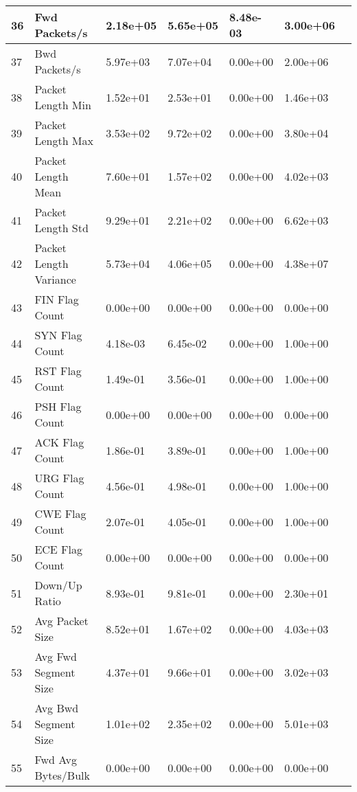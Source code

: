 \begin{center}
\begin{longtable}{|l|l|l|l|l|l|l|}
        \hline
        36 & Fwd Packets/s & 2.18e+05 & 5.65e+05 & 8.48e-03 & 3.00e+06 \\
        \hline
        37 & Bwd Packets/s & 5.97e+03 & 7.07e+04 & 0.00e+00 & 2.00e+06 \\
        \hline
        38 & Packet Length Min & 1.52e+01 & 2.53e+01 & 0.00e+00 & 1.46e+03 \\
        \hline
        39 & Packet Length Max & 3.53e+02 & 9.72e+02 & 0.00e+00 & 3.80e+04 \\
        \hline
        40 & Packet Length Mean & 7.60e+01 & 1.57e+02 & 0.00e+00 & 4.02e+03 \\
        \hline
        41 & Packet Length Std & 9.29e+01 & 2.21e+02 & 0.00e+00 & 6.62e+03 \\
        \hline
        42 & Packet Length Variance & 5.73e+04 & 4.06e+05 & 0.00e+00 & 4.38e+07 \\
        \hline
        43 & FIN Flag Count & 0.00e+00 & 0.00e+00 & 0.00e+00 & 0.00e+00 \\
        \hline
        44 & SYN Flag Count & 4.18e-03 & 6.45e-02 & 0.00e+00 & 1.00e+00 \\
        \hline
        45 & RST Flag Count & 1.49e-01 & 3.56e-01 & 0.00e+00 & 1.00e+00 \\
        \hline
        46 & PSH Flag Count & 0.00e+00 & 0.00e+00 & 0.00e+00 & 0.00e+00 \\
        \hline
        47 & ACK Flag Count & 1.86e-01 & 3.89e-01 & 0.00e+00 & 1.00e+00 \\
        \hline
        48 & URG Flag Count & 4.56e-01 & 4.98e-01 & 0.00e+00 & 1.00e+00 \\
        \hline
        49 & CWE Flag Count & 2.07e-01 & 4.05e-01 & 0.00e+00 & 1.00e+00 \\
        \hline
        50 & ECE Flag Count & 0.00e+00 & 0.00e+00 & 0.00e+00 & 0.00e+00 \\
        \hline
        51 & Down/Up Ratio & 8.93e-01 & 9.81e-01 & 0.00e+00 & 2.30e+01 \\
        \hline
        52 & Avg Packet Size & 8.52e+01 & 1.67e+02 & 0.00e+00 & 4.03e+03 \\
        \hline
        53 & Avg Fwd Segment Size & 4.37e+01 & 9.66e+01 & 0.00e+00 & 3.02e+03 \\
        \hline
        54 & Avg Bwd Segment Size & 1.01e+02 & 2.35e+02 & 0.00e+00 & 5.01e+03 \\
        \hline
        55 & Fwd Avg Bytes/Bulk & 0.00e+00 & 0.00e+00 & 0.00e+00 & 0.00e+00 \\

\end{longtable}
\end{center}
